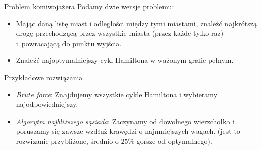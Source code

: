 \documentclass[a4paper,10pt]{beamer}
\begin{document}
\begin{frame}
	
	\begin{block}{Problem komiwojażera}
		Podamy dwie wersje problemu:
		\begin{itemize}
		\item Mając daną listę miast i odległości między tymi miastami, znaleźć najkrótszą drogę przechodzącą przez wszystkie miasta (przez każde tylko raz) i~powracającą do punktu wyjścia.	
		\item Znaleźć najoptymalniejszy cykl Hamiltona w ważonym grafie pełnym.
		\end{itemize}
	\end{block}

	\begin{block}{Przykładowe rozwiązania}
		\begin{itemize}
			\item {\it Brute force}: Znajdujemy wszystkie cykle Hamiltona i wybieramy najodpowiedniejszy.
			\item {\it Algorytm najbliższego sąsiada}: Zaczynamy od dowolnego wierzchołka i poruszamy się zawsze wzdłuż krawędzi o najmniejszych wagach. (jest to rozwizanie przybliżone, średnio o $25\%$ gorsze od optymalnego).
		\end{itemize}
	\end{block}

\end{frame}
\end{document}
